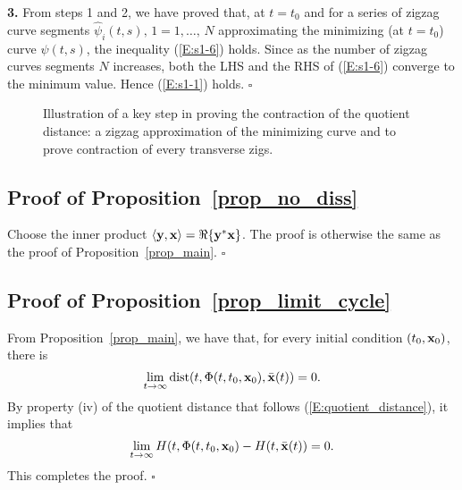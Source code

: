 \noindent \textbf{3.} From steps 1 and 2, we have proved that, at $t = t_0$ and for a series of zigzag curve segments $\hat\psi_i(t, s),\, 1 = 1,\ldots,\, N$ approximating the minimizing (at $t = t_0$) curve $\psi(t, s)$, the inequality (\ref{E:s1-6}) holds. Since as the number of zigzag curves segments $N$ increases, both the LHS and the RHS of (\ref{E:s1-6}) converge to the minimum value. Hence (\ref{E:s1-1}) holds. \hfill $\square$

\begin{figure}[!t]
\caption{Illustration of a key step in proving the contraction of the quotient distance: a zigzag approximation of the minimizing curve and to prove contraction of every transverse zigs.}
\label{fig_quotient_distance}
\hfill\end{figure}


\subsection{Proof of Proposition~\ref{prop_no_diss}}
Choose the inner product $\langle \mathbf{y}, \mathbf{x} \rangle = \Re\{\mathbf{y}^* \mathbf{x}\}$. The proof is otherwise the same as the proof of Proposition~\ref{prop_main}. \hfill $\square$



\subsection{Proof of Proposition~\ref{prop_limit_cycle}}
From Proposition~\ref{prop_main}, we have that, for every initial condition $(t_0, \mathbf{x}_0)$, there is
\begin{equation*}
    \lim_{t\to \infty} \operatorname*{dist}(t, \Phi(t, t_0, \mathbf{x}_0), \bar{\mathbf{x}}(t)) = 0.
\end{equation*}
By property (iv) of the quotient distance that follows (\ref{E:quotient_distance}), it implies that
\begin{equation*}
    \lim_{t\to \infty} H(t, \Phi(t, t_0, \mathbf{x}_0) - H(t, \bar{\mathbf{x}}(t)) = 0.
\end{equation*}
This completes the proof. \hfill $\square$





